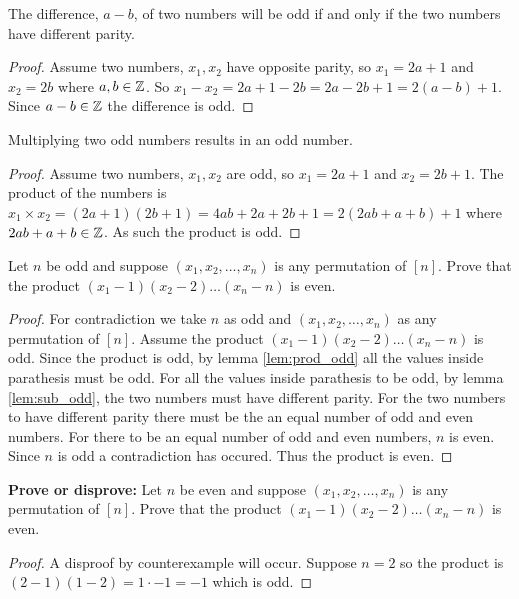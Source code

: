 \documentclass{article}
\begin{document}
\begin{lem}\label{lem:sub_odd}
The difference, $a - b$, of two numbers will be odd if and only if the two numbers have different parity.
\end{lem}

\begin{proof}
Assume two numbers, $x_1, x_2$ have opposite parity, so $x_1 = 2a+1$ and $x_2 = 2b$ where $a, b \in \mathbb Z$. So $x_1 - x_2 = 2a+1 - 2b = 2a - 2b + 1 = 2(a-b)+1$. Since $a-b \in \mathbb Z$ the difference is odd.
\end{proof}

\begin{lem}\label{lem:prod_odd}
Multiplying two odd numbers results in an odd number.
\end{lem}
\begin{proof}
Assume two numbers, $x_1, x_2$ are odd, so $x_1 = 2a+1$ and $x_2 = 2b+1$. The product of the numbers is $x_1 \times x_2 = (2a+1)(2b+1) = 4ab + 2a + 2b + 1 = 2(2ab+a+b) + 1$ where $2ab+a+b \in \mathbb Z$. As such the product is odd.
\end{proof}

\begin{thm}
Let $n$ be odd and suppose $(x_1, x_2, \dots , x_n)$ is any permutation of $[n]$. Prove that the product $(x_1 - 1)(x_2 - 2) \dots (x_n - n)$ is even.
\end{thm}

\begin{proof}
For contradiction we take $n$ as odd and $(x_1, x_2, \dots , x_n)$ as any permutation of $[n]$. Assume the product $(x_1 - 1)(x_2 - 2) \dots (x_n - n)$ is odd. Since the product is odd, by lemma \ref{lem:prod_odd} all the values inside parathesis must be odd. For all the values inside parathesis to be odd, by lemma \ref{lem:sub_odd}, the two numbers must have different parity. For the two numbers to have different parity there must be the an equal number of odd and even numbers. For there to be an equal number of odd and even numbers, $n$ is even. Since $n$ is odd a contradiction has occured. Thus the product is even.
\end{proof}

\begin{thm}
\textbf{Prove or disprove:} Let $n$ be even and suppose $(x_1, x_2, \dots , x_n)$ is any permutation of $[n]$. Prove that the product $(x_1 - 1)(x_2 - 2) \dots (x_n - n)$ is even.
\end{thm}

\begin{proof}
A disproof by counterexample will occur. Suppose $n = 2$ so the product is $(2-1)(1-2) = 1 \cdot -1 = -1$ which is odd.
\end{proof}
\end{document}
